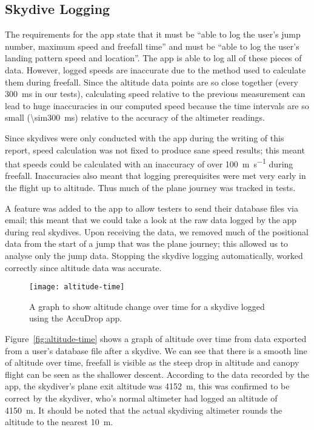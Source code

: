 \subsection{Skydive Logging}\label{subsec:skydive-logging}
The requirements for the app state that it must be ``able to log the user's jump number, maximum speed and freefall time'' and must be ``able to log the user's landing pattern speed and location''. The app is able to log all of these pieces of data. However, logged speeds are inaccurate due to the method used to calculate them during freefall. Since the altitude data points are so close together (every \SI{300}{\milli\second} in our tests), calculating speed relative to the previous measurement can lead to huge inaccuracies in our computed speed because the time intervals are so small (\SI{\sim300}{\milli\second}) relative to the accuracy of the altimeter readings.

Since skydives were only conducted with the app during the writing of this report, speed calculation was not fixed to produce sane speed results; this meant that speeds could be calculated with an inaccuracy of over \SI{100}{\metre\per\second} during freefall. Inaccuracies also meant that logging prerequisites were met very early in the flight up to altitude. Thus much of the plane journey was tracked in tests.

A feature was added to the app to allow testers to send their database files via email; this meant that we could take a look at the raw data logged by the app during real skydives. Upon receiving the data, we removed much of the positional data from the start of a jump that was the plane journey; this allowed us to analyse only the jump data. Stopping the skydive logging automatically, worked correctly since altitude data was accurate.

\begin{figure}[ht]
  \centering
  \texttt{[image: altitude-time]}
  \caption{A graph to show altitude change over time for a skydive logged using the AccuDrop app.}\label{fig:altitude-time}
\end{figure}

Figure~\vref{fig:altitude-time} shows a graph of altitude over time from data exported from a user's database file after a skydive. We can see that there is a smooth line of altitude over time, freefall is visible as the steep drop in altitude and canopy flight can be seen as the shallower descent. According to the data recorded by the app, the skydiver's plane exit altitude was \SI{4152}{\metre}, this was confirmed to be correct by the skydiver, who's normal altimeter had logged an altitude of \SI{4150}{\metre}. It should be noted that the actual skydiving altimeter rounds the altitude to the nearest \SI{10}{\metre}.


